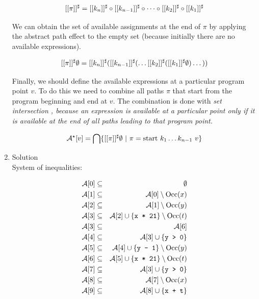 \documentclass[a4paper]{article}
\def\occ{\mathrm{Occ}}
\begin{document}
\begin{enumerate}
  $$ [[\pi]]^\sharp = [[k_n]]^\sharp \circ [[k_{n-1}]]^\sharp \circ \dots \circ [[k_2]]^\sharp \circ [[k_1]]^\sharp $$

  We can obtain the set of available assignments at the end of $ \pi $ by
  applying the abstract path effect to the empty set (because initially there
  are no available expressions).

  $$ [[\pi]]^\sharp \emptyset = [[k_n]]^\sharp([[k_{n-1}]]^\sharp(\dots[[k_2]]^\sharp([[k_1]]^\sharp\emptyset)\dots)) $$

  Finally, we should define the available expressions at a particular program
  point $ v $. To do this we need to combine all paths $ \pi $ that start from
  the program beginning and end at $ v $. The combination is done with \em set
  intersection \em, because an expression is available at a particular point only
  if it is available at the end of all paths leading to that program point.

  $$ \mathcal{A}^\star[v] = \bigcap \{ [[\pi]]^\sharp \emptyset\ |\ \pi = \mbox{start } k_1 \dots k_{n-1}\ v \} $$

  \item Solution \\

  System of inequalities:

  \begin{eqnarray*}
    \mathcal{A}[0] &\subseteq& \emptyset \\
    \mathcal{A}[1] &\subseteq& \mathcal{A}[0] \setminus \occ(x) \\
    \mathcal{A}[2] &\subseteq& \mathcal{A}[1] \setminus \occ(y) \\
    \mathcal{A}[3] &\subseteq& \mathcal{A}[2] \cup \{ \cc{x * 21} \} \setminus \occ(t) \\
    \mathcal{A}[3] &\subseteq& \mathcal{A}[6] \\
    \mathcal{A}[4] &\subseteq& \mathcal{A}[3] \cup \{ \cc{y > 0} \} \\
    \mathcal{A}[5] &\subseteq& \mathcal{A}[4] \cup \{ \cc{y - 1} \} \setminus \occ(y) \\
    \mathcal{A}[6] &\subseteq& \mathcal{A}[5] \cup \{ \cc{x * 21} \} \setminus \occ(t) \\
    \mathcal{A}[7] &\subseteq& \mathcal{A}[3] \cup \{ \cc{y > 0} \} \\
    \mathcal{A}[8] &\subseteq& \mathcal{A}[7] \setminus \occ(x) \\
    \mathcal{A}[9] &\subseteq& \mathcal{A}[8] \cup \{ \cc{x + t} \} \\
  \end{eqnarray*}


\end{enumerate}
\end{document}
